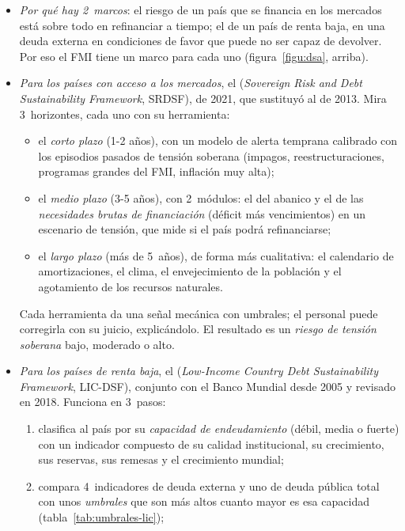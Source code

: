 \documentclass[11pt]{article}
\begin{document}
\begin{itemize}
\item \emph{Por qué hay 2~marcos}: el riesgo de un país que se financia en los mercados está sobre todo en refinanciar a tiempo; el de un país de renta baja, en una deuda externa en condiciones de favor que puede no ser capaz de devolver. Por eso el FMI tiene un marco para cada uno (figura~\ref{figu:dsa}, arriba).
\item \emph{Para los países con acceso a los mercados}, el  (\emph{Sovereign Risk and Debt Sustainability Framework}, SRDSF), de 2021, que sustituyó al de 2013\nocite{FMI2021DSA}. Mira 3~horizontes, cada uno con su herramienta:
  \begin{itemize}
  \item el \emph{corto plazo} (1-2 años), con un modelo de alerta temprana calibrado con los episodios pasados de tensión soberana (impagos, reestructuraciones, programas grandes del FMI, inflación muy alta);
  \item el \emph{medio plazo} (3-5 años), con 2~módulos: el del abanico y el de las \emph{necesidades brutas de financiación} (déficit más vencimientos) en un escenario de tensión, que mide si el país podrá refinanciarse;
  \item el \emph{largo plazo} (más de 5~años), de forma más cualitativa: el calendario de amortizaciones, el clima, el envejecimiento de la población y el agotamiento de los recursos naturales.
  \end{itemize}
  Cada herramienta da una señal mecánica con umbrales; el personal puede corregirla con su juicio, explicándolo. El resultado es un \emph{riesgo de tensión soberana} bajo, moderado o alto.
\item \emph{Para los países de renta baja}, el  (\emph{Low-Income Country Debt Sustainability Framework}, LIC-DSF), conjunto con el Banco Mundial desde 2005 y revisado en 2018\nocite{FMI2018LICDSF}. Funciona en 3~pasos:
  \begin{enumerate}
  \item clasifica al país por su \emph{capacidad de endeudamiento} (débil, media o fuerte) con un indicador compuesto de su calidad institucional, su crecimiento, sus reservas, sus remesas y el crecimiento mundial;
  \item compara 4~indicadores de deuda externa y uno de deuda pública total con unos \emph{umbrales} que son más altos cuanto mayor es esa capacidad (tabla~\ref{tab:umbrales-lic});

\end{enumerate}
\end{itemize}
\end{document}
